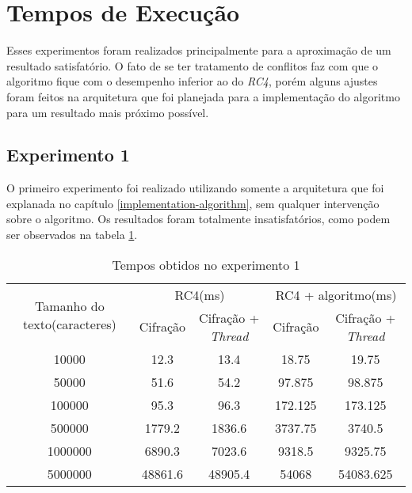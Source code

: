\section{Tempos de Execução}

Esses experimentos foram realizados principalmente para a aproximação de um resultado satisfatório. O fato de se ter tratamento de conflitos faz com que o algoritmo fique com o desempenho inferior ao do \textit{RC4}, porém alguns ajustes foram feitos na arquitetura que foi planejada para a implementação do algoritmo para um resultado mais próximo possível.

\subsection{Experimento 1}

O primeiro experimento foi realizado utilizando somente a arquitetura que foi explanada no capítulo \ref{implementation-algorithm}, sem qualquer intervenção sobre o algoritmo. Os resultados foram totalmente insatisfatórios, como podem ser observados na tabela \ref{results-experiment-1}.

\begin{table}[h]
\centering
\begin{tabular}{|c|c|c|c|c|}
\hline
\multirow{2}{3cm}{Tamanho do texto(caracteres)} & \multicolumn{2}{c|}{RC4(ms)}     & \multicolumn{2}{c|}{RC4 + algoritmo(ms)} \\ \cline{2-5} 
                                     & Cifração & Cifração + \textit{Thread} & Cifração     & Cifração + \textit{Thread}     \\ \hline
10000                                & 12.3     & 13.4              & 18.75        & 19.75                 \\ \hline
50000                                & 51.6     & 54.2              & 97.875       & 98.875                \\ \hline
100000                               & 95.3     & 96.3              & 172.125      & 173.125               \\ \hline
500000                               & 1779.2   & 1836.6            & 3737.75      & 3740.5                \\ \hline
1000000                              & 6890.3   & 7023.6            & 9318.5       & 9325.75               \\ \hline
5000000                              & 48861.6  & 48905.4           & 54068        & 54083.625             \\ \hline
\end{tabular}
\caption{Tempos obtidos no experimento 1}
\label{results-experiment-1}
\end{table}

